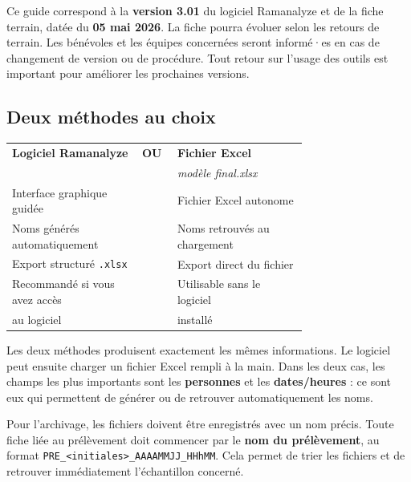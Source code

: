 \documentclass[12pt, a4paper]{article}
\begin{document}
\begin{attention}
  Ce guide correspond à la \textbf{version 3.01} du logiciel Ramanalyze
  et de la fiche terrain, datée du \textbf{05 mai 2026}. La fiche pourra
  évoluer selon les retours de terrain. Les bénévoles et les équipes
  concernées seront informé·es en cas de changement de version ou de
  procédure. Tout retour sur l'usage des outils est important pour
  améliorer les prochaines versions.
\end{attention}

\subsection{Deux méthodes au choix}

\begin{center}
{\small
\begin{tabularx}{0.9\linewidth}{C{0.34\linewidth} C{0.05\linewidth} C{0.34\linewidth}}
  \toprule
  \textbf{Logiciel Ramanalyze} & \textbf{OU} & \textbf{Fichier Excel} \\
  & & \textit{modèle final.xlsx} \\
  \midrule
  Interface graphique guidée & & Fichier Excel autonome \\
  Noms générés automatiquement & & Noms retrouvés au chargement \\
  Export structuré \texttt{.xlsx} & & Export direct du fichier \\
  Recommandé si vous avez accès & & Utilisable sans le logiciel \\
  au logiciel & & installé \\
  \bottomrule
\end{tabularx}
}
\end{center}

Les deux méthodes produisent exactement les mêmes informations.
Le logiciel peut ensuite charger un fichier Excel rempli à la main.
Dans les deux cas, les champs les plus importants sont les
\textbf{personnes} et les \textbf{dates/heures} : ce sont eux qui
permettent de générer ou de retrouver automatiquement les noms.

\begin{important}
  Pour l'archivage, les fichiers doivent être enregistrés avec un
  nom précis. Toute fiche liée au prélèvement doit commencer par le
  \textbf{nom du prélèvement}, au format
  \texttt{PRE\_<initiales>\_AAAAMMJJ\_HHhMM}. Cela permet de trier
  les fichiers et de retrouver immédiatement l'échantillon concerné.
\end{important}
\end{document}
